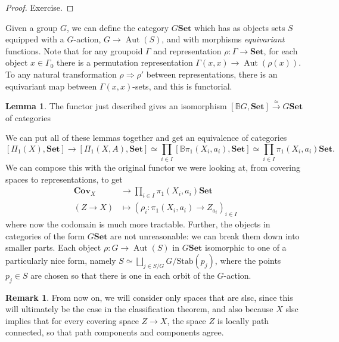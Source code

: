 \documentclass{tufte-handout}
\def\Set {\mathbf{Set}}
\def\Cov {\mathbf{Cov}}
\DeclareMathOperator{\Aut}{Aut}
\theoremstyle{definition}
\newtheorem{lemma}{Lemma}
\newtheorem*{rem}{Remark}
\begin{document}
\begin{proof}
Exercise.
\end{proof}

Given a group $G$, we can define the category $G\Set$ which has as objects sets $S$ 
equipped with a $G$-action, $G\to \Aut(S)$, and with morphisms \emph{equivariant} 
functions. Note that for any groupoid $\Gamma$ and representation 
$\rho\colon \Gamma \to \Set$, for each object $x\in \Gamma_0$ there is a permutation 
representation $\Gamma(x,x) \to \Aut(\rho(x))$. To any natural transformation 
$\rho\Rightarrow \rho'$ between representations, there is an equivariant map between 
$\Gamma(x,x)$-sets, and this is functorial.

\begin{lemma}
The functor just described gives an isomorphism $[\mathbb{B}G,\Set] \xrightarrow{\simeq} G\Set$ of categories
\end{lemma}

We can put all of these lemmas together and get an equivalence of categories
\[
[\Pi_1(X),\Set] \to [\Pi_1(X,A),\Set] \simeq \prod_{i\in I}[\mathbb{B}\pi_1(X_i,a_i),\Set]
\simeq \prod_{i\in I}\pi_1(X_i,a_i)\Set.
\]
We can compose this with the original functor we were looking at, from covering spaces to representations, to get
\begin{align}
	\Cov_X & \to \prod_{i\in I}\pi_1(X_i,a_i)\Set \label{eq:fibre_functor}\\
	(Z\to X) & \mapsto (\rho_i\colon \pi_1(X_i,a_i) \to Z_{a_i})_{i\in I} \nonumber
\end{align}
where now the codomain is much more tractable. Further, the objects in categories of the 
form $G\Set$ are not unreasonable: we can break them down into smaller parts. Each 
object $\rho\colon G\to \Aut(S)$ in $G\Set$ isomorphic to one of a particularly nice 
form, namely $S\simeq \bigsqcup_{j\in S/G} G/\mathrm{Stab}(p_j)$, where the points 
$p_j\in S$ are chosen so that there is one in each orbit of the $G$-action.

\begin{rem}
From now on, we will consider only spaces that are slsc, since this will ultimately be 
the case in the classification theorem, and also because $X$ slsc implies that for every 
covering space $Z\to X$, the space $Z$ is locally path connected, so that path 
components and components agree.
\end{rem}
\end{document}
